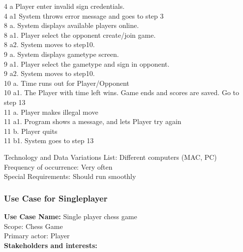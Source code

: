 \documentclass{article}
\begin{document}
\begin{flushleft}
\hspace{5mm} 4 a Player enter invalid sign credentials.\\
\hspace{5mm} 4 a1 System throws error message and goes to step 3\\
\hspace{5mm} 8 a. System displays available players online.\\
\hspace{5mm} 8 a1. Player select the opponent create/join game.\\
\hspace{5mm} 8 a2. System moves to step10.\\
\hspace{5mm} 9 a. System displays gametype screen.\\
\hspace{5mm} 9 a1. Player select the gametype and sign in opponent. \\
\hspace{5mm} 9 a2. System moves to step10.\\
\hspace{5mm} 10 a. Time runs out for Player/Opponent\\
\hspace{5mm} 10 a1. The Player with time left wins. Game ends and scores are saved. Go to step 13\\
\hspace{5mm} 11 a. Player makes illegal move\\
\hspace{5mm} 11 a1. Program shows a message, and lets Player try again\\
\hspace{5mm} 11 b. Player quits\\
\hspace{5mm} 11 b1. System goes to step 13\\
\vspace{3mm}

Technology and Data Variations List:\hspace{3mm} Different computers (MAC, PC)\\
Frequency of occurrence:\hspace{3mm} Very often\\
Special Requirements:\hspace{3mm} Should run smoothly\\

\newpage

\subsubsection{Use Case for Singleplayer}
\textbf {Use Case Name:} Single player chess game\\
\vspace{1mm}
Scope: Chess Game\\
\vspace{1mm}
Primary actor: Player\\
\vspace{1mm}
\textbf{Stakeholders and interests:}\\


\end{flushleft}
\end{document}
